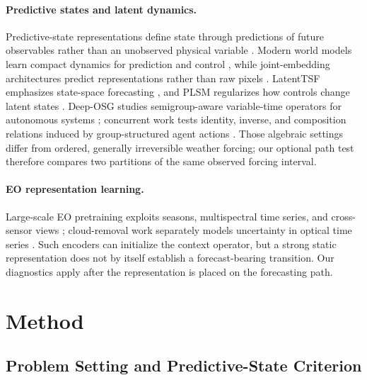 \documentclass[letterpaper]{article} %
\begin{document}
\paragraph{Predictive states and latent dynamics.}
Predictive-state representations define state through predictions of future observables rather than an unobserved physical variable \cite{littman2001predictive}. Modern world models learn compact dynamics for prediction and control \cite{ha2018worldmodels,hafner2019planet,hafner2020dreamer}, while joint-embedding architectures predict representations rather than raw pixels \cite{assran2023ijepa,bardes2024vjepa}. LatentTSF emphasizes state-space forecasting \cite{yang2026latenttsf}, and PLSM regularizes how controls change latent states \cite{saanum2024simplifying}. Deep-OSG studies semigroup-aware variable-time operators for autonomous systems \cite{chen2023deeposg}; concurrent work tests identity, inverse, and composition relations induced by group-structured agent actions \cite{wang2026groupactions}. Those algebraic settings differ from ordered, generally irreversible weather forcing; our optional path test therefore compares two partitions of the same observed forcing interval.

\paragraph{EO representation learning.}
Large-scale EO pretraining exploits seasons, multispectral time series, and cross-sensor views \cite{manas2021seco,cong2022satmae,wang2023ssl4eo,fuller2023croma,guo2024skysense}; cloud-removal work separately models uncertainty in optical time series \cite{ebel2023uncrtaints}. Such encoders can initialize the context operator, but a strong static representation does not by itself establish a forecast-bearing transition. Our diagnostics apply after the representation is placed on the forecasting path.

\section{Method}

\subsection{Problem Setting and Predictive-State Criterion}
\end{document}
